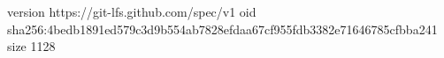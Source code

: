 version https://git-lfs.github.com/spec/v1
oid sha256:4bedb1891ed579c3d9b554ab7828efdaa67cf955fdb3382e71646785cfbba241
size 1128
